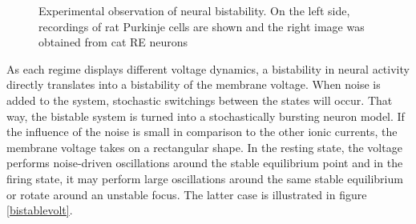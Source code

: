 \documentclass[12pt,a4paper]{article}
\begin{document}
\begin{figure}[H]
	\caption{Experimental observation of neural bistability. On the left side, recordings of rat Purkinje cells are shown\cite{sensorystm1} and the right image was obtained from cat RE neurons\cite{spindle}}
	\label{expbistable} 
\end{figure}
As each regime displays different voltage dynamics, a bistability in neural activity directly translates into a bistability of the membrane voltage. When noise is added to the system, stochastic switchings between the states will occur. That way, the bistable system is turned into a stochastically bursting neuron model. If the influence of the noise is small in comparison to the other ionic currents, the membrane voltage takes on a rectangular shape. In the resting state, the voltage performs noise-driven oscillations around the stable equilibrium point and in the firing state, it may perform large oscillations around the same stable equilibrium or rotate around an unstable focus. The latter case is illustrated in figure \ref{bistablevolt}. 
\end{document}
